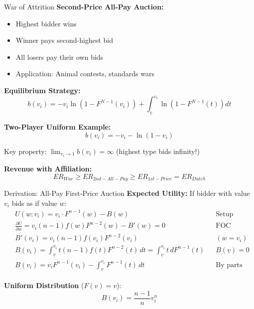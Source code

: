 \documentclass[xcolor={x11names}]{beamer}
\begin{document}
\begin{frame}{War of Attrition}
\textbf{Second-Price All-Pay Auction:}
\begin{itemize}
\item Highest bidder wins
\item Winner pays second-highest bid
\item All losers pay their own bids
\item Application: Animal contests, standards wars
\end{itemize}

\textbf{Equilibrium Strategy:}
$$b(v_i) = -v_i \ln(1 - F^{N-1}(v_i)) + \int_{\underline{v}}^{v_i} \ln(1 - F^{N-1}(t))dt$$

\textbf{Two-Player Uniform Example:}
$$b(v_i) = -v_i - \ln(1-v_i)$$

Key property: $\lim_{v_i \to 1} b(v_i) = \infty$ (highest type bids infinity!)

\textbf{Revenue with Affiliation:}
$$ER_{War} \geq ER_{2nd-All-Pay} \geq ER_{1st-Price} = ER_{Dutch}$$
\end{frame}

\begin{frame}{Derivation: All-Pay First-Price Auction}
\textbf{Expected Utility:} If bidder with value $v_i$ bids as if value $w$:
\begin{align*}
&U(w; v_i) = v_i \cdot F^{n-1}(w) - B(w) && \text{Setup} \\
&\frac{\partial U}{\partial w} = v_i(n-1)f(w)F^{n-2}(w) - B'(w) = 0 && \text{FOC} \\
&B'(v_i) = v_i(n-1)f(v_i)F^{n-2}(v_i) && (w = v_i) \\
& B(v_i) = \int_{\underline{v}}^{v_i} t(n-1)f(t)F^{n-2}(t) \, dt = \int_{\underline{v}}^{v_i} t \, dF^{n-1}(t) && B(\underline{v}) = 0 \\
&B(v_i) = v_i F^{n-1}(v_i) - \int_{\underline{v}}^{v_i} F^{n-1}(t) \, dt && \text{By parts}
\end{align*}

\textbf{Uniform Distribution} ($F(v) = v$):
$$\boxed{B(v_i) = \frac{n-1}{n} v_i^n}$$
\end{frame}
\end{document}
